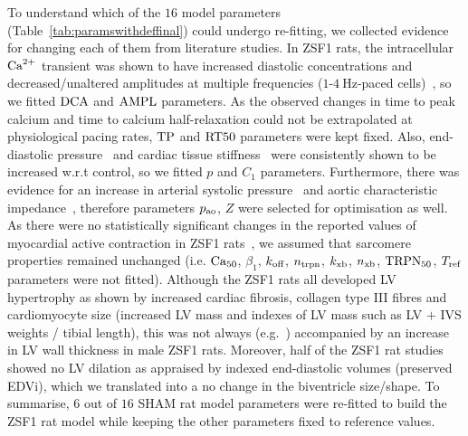 \vspace{0.2cm}
To understand which of the $16$ model parameters (Table~\ref{tab:paramswithdeffinal}) could undergo re-fitting, we collected evidence for changing each of them from literature studies. In ZSF1 rats, the intracellular $\textrm{Ca}^{2+}$ transient was shown to have increased diastolic concentrations and decreased/unaltered amplitudes at multiple frequencies ($1$-$\SI{4}{\Hz}$-paced cells)~\cite{Miranda-Silva:2020, Abdellatif:2021}, so we fitted $\textrm{DCA}$ and $\textrm{AMPL}$ parameters. As the observed changes in time to peak calcium and time to calcium half-relaxation could not be extrapolated at physiological pacing rates, $\textrm{TP}$ and $\textrm{RT50}$ parameters were kept fixed. Also, end-diastolic pressure~\cite{Abdellatif:2016, Bowen:2017, Hamdani:2013, Hohendanner:2018, Lai:2016, Leite:2015, Leite:2015*a, Leite:2019, Salah:2018, Schmederer:2018} and cardiac tissue stiffness~\cite{Hamdani:2013, Abdellatif:2016, Van-Dijk:2016, Salah:2018, Schmederer:2018, Leite:2019, Davila:2019, Nguyen:2020} were consistently shown to be increased w.r.t control, so we fitted $p$ and $C_1$ parameters. Furthermore, there was evidence for an increase in arterial systolic pressure~\cite{Cuijpers:2020} and aortic characteristic impedance~\cite{Leite:2019}, therefore parameters $p_{\textrm{ao}}$, $Z$ were selected for optimisation as well. As there were no statistically significant changes in the reported values of myocardial active contraction in ZSF1 rats~\cite{Deel:2017, McCain:2014, Hersch:2013}, we assumed that sarcomere properties remained unchanged (i.e. $\textrm{Ca}_{50}$, $\beta_1$, $k_{\textrm{off}}$, $n_{\textrm{trpn}}$, $k_{\textrm{xb}}$, $n_{\textrm{xb}}$, $\textrm{TRPN}_{50}$, $T_{\textrm{ref}}$ parameters were not fitted). Although the ZSF1 rats all developed LV hypertrophy as shown by increased cardiac fibrosis, collagen type III fibres and cardiomyocyte size (increased LV mass and indexes of LV mass such as LV $+$ IVS weights / tibial length), this was not always (e.g.~\cite{Van-Dijk:2016, Schmederer:2018}) accompanied by an increase in LV wall thickness in male ZSF1 rats. Moreover, half of the ZSF1 rat studies~\cite{Hamdani:2013, Leite:2015, Leite:2015*a, Leite:2019, Abdellatif:2016, Lai:2016, Van-Dijk:2016, Nguyen:2020} showed no LV dilation as appraised by indexed end-diastolic volumes (preserved EDVi), which we translated into a no change in the biventricle size/shape. To summarise, $6$ out of $16$ SHAM rat model parameters were re-fitted to build the ZSF1 rat model while keeping the other parameters fixed to reference values.

